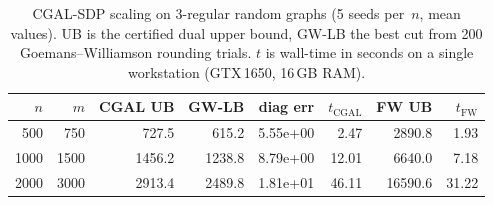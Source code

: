 \begin{table}[t]
\centering
\caption{CGAL-SDP scaling on 3-regular random graphs (5 seeds per~$n$,
  mean values). UB is the certified dual upper bound,
  GW-LB the best cut from 200 Goemans--Williamson rounding trials.
  $t$ is wall-time in seconds on a single workstation (GTX\,1650, 16\,GB RAM).}
\label{tab:b176b-scale}
\begin{tabular}{rrrrrrrr}
\toprule
$n$ & $m$ & CGAL UB & GW-LB & diag err & $t_{\mathrm{CGAL}}$ & FW UB & $t_{\mathrm{FW}}$ \\
\midrule
500 & 750 & 727.5 & 615.2 & 5.55e+00 & 2.47 & 2890.8 & 1.93 \\
1000 & 1500 & 1456.2 & 1238.8 & 8.79e+00 & 12.01 & 6640.0 & 7.18 \\
2000 & 3000 & 2913.4 & 2489.8 & 1.81e+01 & 46.11 & 16590.6 & 31.22 \\
\bottomrule
\end{tabular}
\end{table}
